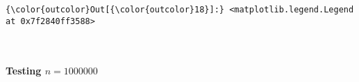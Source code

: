 \documentclass[11pt]{article}
\begin{document}
\begin{Verbatim}[commandchars=\\\{\}]
{\color{outcolor}Out[{\color{outcolor}18}]:} <matplotlib.legend.Legend at 0x7f2840ff3588>
\end{Verbatim}
            
    \begin{center}
    \end{center}
    { \hspace*{\fill} \\}
    
    \paragraph{\texorpdfstring{Testing
\(n = 1000000\)}{Testing n = 1000000}}\label{testing-n-1000000}
\end{document}
